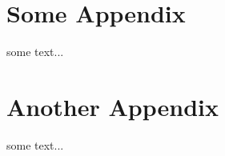 \appendix

\chapter{Some Appendix}\label{app:SomeAppendix}
some text...

\chapter{Another Appendix}\label{app:AnotherAppendix}
some text...